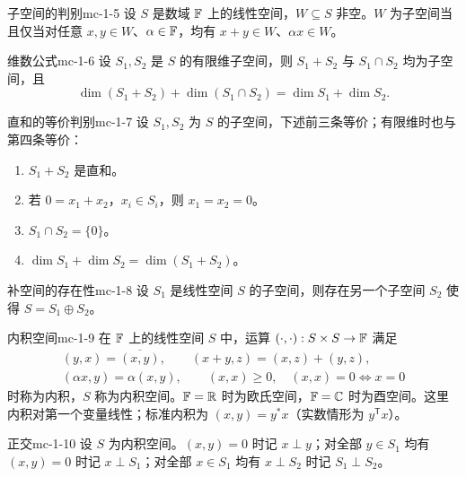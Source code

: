 \begin{theorem}{子空间的判别}{mc-1-5}
设 $S$ 是数域 $\mathbb{F}$ 上的线性空间，$W\subseteq S$ 非空。$W$ 为子空间当且仅当对任意 $x,y\in W$、$\alpha\in\mathbb{F}$，均有 $x+y\in W$、$\alpha x\in W$。
\end{theorem}

\begin{theorem}{维数公式}{mc-1-6}
设 $S_1,S_2$ 是 $S$ 的有限维子空间，则 $S_1+S_2$ 与 $S_1\cap S_2$ 均为子空间，且
\[\dim(S_1+S_2)+\dim(S_1\cap S_2)=\dim S_1+\dim S_2.\]
\end{theorem}

\begin{theorem}{直和的等价判别}{mc-1-7}
设 $S_1,S_2$ 为 $S$ 的子空间，下述前三条等价；有限维时也与第四条等价：
\begin{enumerate}
\item $S_1+S_2$ 是直和。
\item 若 $0=x_1+x_2$，$x_i\in S_i$，则 $x_1=x_2=0$。
\item $S_1\cap S_2=\{0\}$。
\item $\dim S_1+\dim S_2=\dim(S_1+S_2)$。
\end{enumerate}
\end{theorem}

\begin{theorem}{补空间的存在性}{mc-1-8}
设 $S_1$ 是线性空间 $S$ 的子空间，则存在另一个子空间 $S_2$ 使得 $S=S_1\oplus S_2$。
\end{theorem}

\begin{definition}{内积空间}{mc-1-9}
在 $\mathbb{F}$ 上的线性空间 $S$ 中，运算 $(\cdot,\cdot):S\times S\to\mathbb{F}$ 满足
\[
\begin{gathered}
(y,x)=\overline{(x,y)},\qquad(x+y,z)=(x,z)+(y,z),\\
(\alpha x,y)=\alpha(x,y),\qquad(x,x)\geq0,\quad(x,x)=0\iff x=0
\end{gathered}
\]
时称为内积，$S$ 称为内积空间。$\mathbb{F}=\mathbb{R}$ 时为欧氏空间，$\mathbb{F}=\mathbb{C}$ 时为酉空间。这里内积对第一个变量线性；标准内积为 $(x,y)=y^*x$（实数情形为 $y^{\mathsf T}x$）。
\end{definition}

\begin{definition}{正交}{mc-1-10}
设 $S$ 为内积空间。$(x,y)=0$ 时记 $x\perp y$；对全部 $y\in S_1$ 均有 $(x,y)=0$ 时记 $x\perp S_1$；对全部 $x\in S_1$ 均有 $x\perp S_2$ 时记 $S_1\perp S_2$。
\end{definition}

